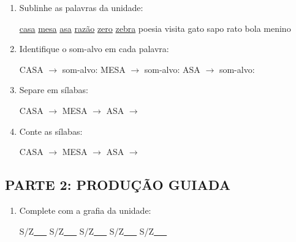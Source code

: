 \begin{exercicio}
\begin{enumerate}
  \item Sublinhe as palavras da unidade:

\begin{center}
  \uline{casa} \quad \uline{mesa} \quad \uline{asa} \quad \uline{razão} \quad \uline{zero} \quad \uline{zebra} \quad poesia \quad visita \quad gato \quad sapo \quad rato \quad bola \quad menino
\end{center}

  \item Identifique o som-alvo em cada palavra:
  \begin{center}
  CASA $\rightarrow$ som-alvo: \underline{\hspace{1cm}} \quad MESA $\rightarrow$ som-alvo: \underline{\hspace{1cm}} \quad ASA $\rightarrow$ som-alvo: \underline{\hspace{1cm}}
  \end{center}

  \item Separe em sílabas:
  \begin{center}
  CASA $\rightarrow$ \underline{\hspace{1cm}} \quad MESA $\rightarrow$ \underline{\hspace{1cm}} \quad ASA $\rightarrow$ \underline{\hspace{1cm}}
  \end{center}

  \item Conte as sílabas:
  \begin{center}
  CASA $\rightarrow$ \underline{\hspace{0.9cm}} \quad MESA $\rightarrow$ \underline{\hspace{0.9cm}} \quad ASA $\rightarrow$ \underline{\hspace{0.9cm}}
  \end{center}

\end{enumerate}

\subsection*{PARTE 2: PRODUÇÃO GUIADA}

\begin{enumerate}[resume]

  \item Complete com a grafia da unidade:
  \begin{center}
  S/Z\underline{~~~} \quad S/Z\underline{~~~} \quad S/Z\underline{~~~} \quad S/Z\underline{~~~} \quad S/Z\underline{~~~}
  \end{center}


\end{enumerate}
\end{exercicio}
